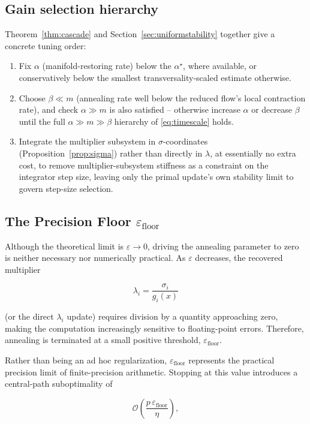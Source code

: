 \documentclass[11pt,onecolumn]{article}
\theoremstyle{definition}
\theoremstyle{remark}
\begin{document}
\subsection{Gain selection hierarchy}
Theorem~\ref{thm:cascade} and Section~\ref{sec:uniformstability} together give a concrete
tuning order:
\begin{enumerate}
\item Fix $\alpha$ (manifold-restoring rate) below the $\alpha^\star$, where
  available, or conservatively below the smallest transversality-scaled estimate otherwise.
\item Choose $\beta \ll m$ (annealing rate well below the reduced flow's local contraction
  rate), and check $\alpha \gg m$ is also satisfied -- otherwise increase $\alpha$ or decrease
  $\beta$ until the full $\alpha \gg m \gg \beta$ hierarchy of \eqref{eq:timescale} holds.
\item Integrate the multiplier subsystem in $\sigma$-coordinates (Proposition~\ref{prop:sigma})
  rather than directly in $\lambda$, at essentially no extra cost, to remove
  multiplier-subsystem stiffness as a constraint on the integrator step size, leaving only the
  primal update's own stability limit to govern step-size selection.
\end{enumerate}

\subsection{The Precision Floor $\varepsilon_{\text{floor}}$}

Although the theoretical limit is $\varepsilon \rightarrow 0$, driving the annealing parameter to zero is neither necessary nor numerically practical. As $\varepsilon$ decreases, the recovered multiplier

\[
\lambda_i=\frac{\sigma_i}{g_i(x)}
\]

(or the direct $\lambda_i$ update) requires division by a quantity approaching zero, making the computation increasingly sensitive to floating-point errors. Therefore, annealing is terminated at a small positive threshold, $\varepsilon_{\text{floor}}$.

Rather than being an ad hoc regularization, $\varepsilon_{\text{floor}}$ represents the practical precision limit of finite-precision arithmetic. Stopping at this value introduces a central-path suboptimality of

\[
\mathcal{O}\!\left(\frac{p\,\varepsilon_{\text{floor}}}{\eta}\right),
\]
\end{document}
